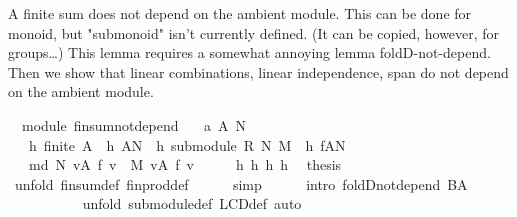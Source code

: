 \begin{isabellebody}
\isanewline
{}\isamarkupfalse%
%
\endisatagproof
{\isafoldproof}%
%
\isadelimproof
%
\endisadelimproof
%
\begin{isamarkuptext}%
A finite sum does not depend on the ambient module. This can be done for monoid, but 
"submonoid" isn't currently defined. (It can be copied, however, for groups\ldots)
This lemma requires a somewhat annoying lemma foldD-not-depend. Then we show that linear combinations, 
linear independence, span do not depend on the ambient module.%
\end{isamarkuptext}%
\isamarkuptrue%
\isamarkupfalse%
\ {\isacharparenleft}\ module{\isacharparenright}\ finsum{\isacharunderscore}not{\isacharunderscore}depend{\isacharcolon}\isanewline
\ \ \ a\ A\ N\isanewline
\ \ \ h{}{\isacharcolon}\ {\isachardoublequoteopen}finite\ A{\isachardoublequoteclose}\ \ h{}{\isacharcolon}\ {\isachardoublequoteopen}A{\isasymsubseteq}N{\isachardoublequoteclose}\ \ h{}{\isacharcolon}\ {\isachardoublequoteopen}submodule\ R\ N\ M{\isachardoublequoteclose}\ \ h{}{\isacharcolon}\ {\isachardoublequoteopen}f{\isacharcolon}A{\isasymrightarrow}N{\isachardoublequoteclose}\isanewline
\ \ \ {\isachardoublequoteopen}{\isacharparenleft}{\isasymOplus}\isactrlbsub {\isacharparenleft}md\ N{\isacharparenright}\isactrlesub \ v{\isasymin}A{\isachardot}\ f\ v{\isacharparenright}\ {\isacharequal}\ {\isacharparenleft}{\isasymOplus}\isactrlbsub M\isactrlesub \ v{\isasymin}A{\isachardot}\ f\ v{\isacharparenright}{\isachardoublequoteclose}\isanewline
%
\isadelimproof
%
\endisadelimproof
%
\isatagproof
{}\isamarkupfalse%
\ {\isacharminus}\isanewline
\ \ \isamarkupfalse%
\ h{}\ h{}\ h{}\ h{}\ \isamarkupfalse%
\ {\isacharquery}thesis\isanewline
\ \ \ \ \isamarkupfalse%
\ {\isacharparenleft}unfold\ finsum{\isacharunderscore}def\ finprod{\isacharunderscore}def{\isacharparenright}\isanewline
\ \ \ \ \isamarkupfalse%
\ simp\isanewline
\ \ \ \ \isamarkupfalse%
\ {\isacharparenleft}intro\ foldD{\isacharunderscore}not{\isacharunderscore}depend{\isacharbrackleft}\ {\isacharquery}B{\isacharequal}{\isachardoublequoteopen}A{\isachardoublequoteclose}{\isacharbrackright}{\isacharparenright}\isanewline
\ \ \ \ \ \ \ \ \ \isamarkupfalse%
\ {\isacharparenleft}unfold\ submodule{\isacharunderscore}def\ LCD{\isacharunderscore}def{\isacharcomma}\ auto{\isacharparenright}\isanewline

\end{isabellebody}
